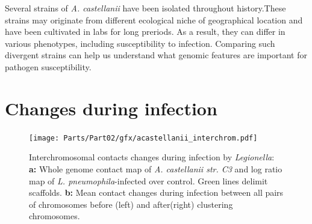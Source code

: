 Several strains of \textit{A. castellanii} have been isolated throughout history.These strains may originate from different ecological niche of geographical location and have been cultivated in labs for long preriods. As a result, they can differ in various phenotypes, including susceptibility to infection. Comparing such divergent strains can help us understand what genomic features are important for pathogen susceptibility.


\section{Changes during infection}

\begin{figure}[b]
    \texttt{[image: Parts/Part02/gfx/acastellanii\_interchrom.pdf]}
    \caption[Interchromosomal contacts changes during infection by \textit{Legionella}.]{Interchromosomal contacts changes during infection by \textit{Legionella}: \textbf{a:} Whole genome contact map of \textit{A. castellanii str. C3} and log ratio map of \textit{L. pneumophila}-infected over control. Green lines delimit scaffolds. \textbf{b:} Mean contact changes during infection between all pairs of chromosomes before (left) and after(right) clustering chromosomes.}
	\label{fig:02-02:inter-infection}
\end{figure}



